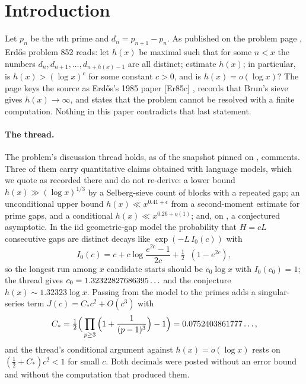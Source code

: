 \documentclass[11pt]{article}
\DeclareMathOperator{\Li}{Li_2}
\theoremstyle{definition}\newtheorem{observation}{Observation}
\newcommand{\Cstar}{C_{*}}
\begin{document}
\section{Introduction}

Let $p_n$ be the $n$th prime and $d_n=p_{n+1}-p_n$. As published on the problem page \cite{Bloom852}, Erd\H{o}s problem 852 reads: let $h(x)$ be maximal such that for some $n<x$ the numbers $d_n,d_{n+1},\dots,d_{n+h(x)-1}$ are all distinct; estimate $h(x)$; in particular, is $h(x)>(\log x)^c$ for some constant $c>0$, and is $h(x)=o(\log x)$? The page keys the source as Erd\H{o}s's 1985 paper [Er85c] \cite{Er85c}, records that Brun's sieve gives $h(x)\to\infty$, and states that the problem cannot be resolved with a finite computation. Nothing in this paper contradicts that last statement.

\paragraph{The thread.} The problem's discussion thread \cite{Thread852} holds, as of the snapshot pinned on \ThreadFetchDate, \ThreadCommentsBefore{} comments. Three of them carry quantitative claims obtained with language models, which we quote as recorded there and do not re-derive: a lower bound $h(x)\gg(\log x)^{1/3}$ by a Selberg-sieve count of blocks with a repeated gap; an unconditional upper bound $h(x)\ll x^{0.41+\epsilon}$ from a second-moment estimate for prime gaps, and a conditional $h(x)\ll x^{0.26+o(1)}$; and, on \ThreadDateConstants, a conjectured asymptotic. In the iid geometric-gap model the probability that $H=cL$ consecutive gaps are distinct decays like $\exp(-L\,I_0(c))$ with
\begin{equation}\label{eq:I0}
I_0(c)=c+c\log\frac{e^{2c}-1}{2c}+\tfrac12\Li\!\left(1-e^{2c}\right),
\end{equation}
so the longest run among $x$ candidate starts should be $c_0\log x$ with $I_0(c_0)=1$; the thread gives $c_0=1.32322827686395\ldots$ and the conjecture $h(x)\sim 1.32323\log x$. Passing from the model to the primes adds a singular-series term $J(c)=\Cstar c^2+O(c^3)$ with
\begin{equation}\label{eq:Cstar}
\Cstar=\tfrac12\Big(\prod_{p\ge3}\Big(1+\frac{1}{(p-1)^3}\Big)-1\Big)=\CstarPublished\ldots,
\end{equation}
and the thread's conditional argument against $h(x)=o(\log x)$ rests on $(\tfrac12+\Cstar)c^2<1$ for small $c$. Both decimals were posted without an error bound and without the computation that produced them.
\end{document}
